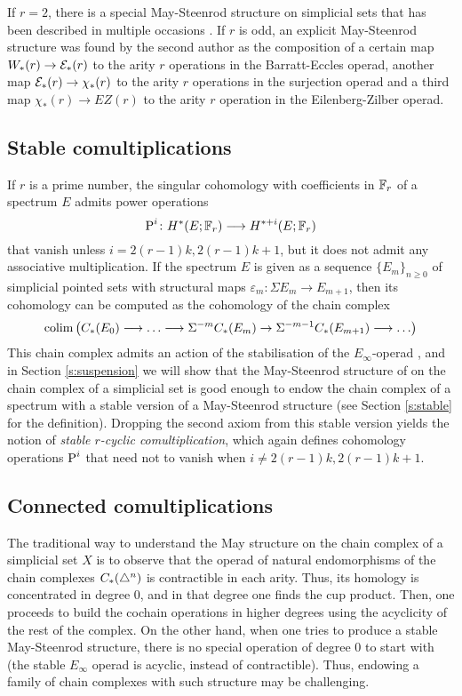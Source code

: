 If $r=2$, there is a special May-Steenrod structure on simplicial sets that has been described in multiple occasions \cite{steenrod1947products,gonzalez-diaz1999steenrod,medina2021fast_sq}. If $r$ is odd, an explicit May-Steenrod structure was found by the second author \cite{medina2021may_st} as the composition of a certain map $W_*(r)\to \mathcal{E}_*(r)$ to the arity $r$ operations in the Barratt-Eccles operad, another map $\mathcal{E}_*(r)\to \chi_*(r)$ to the arity $r$ operations in the surjection operad \cite{berger2004combinatorial} and a third map $\chi_*(r)\to EZ(r)$ to the arity $r$ operation in the Eilenberg-Zilber operad\cite{mcclure2003multivariable}.

\subsection{Stable comultiplications} If $r$ is a prime number, the singular cohomology with coefficients in $\mathbb{F}_r$ of a spectrum $E$ admits power operations
\[
	\operatorname{P}^i\colon H^*(E;\mathbb{F}_r)\longrightarrow H^{*+i}(E;\mathbb{F}_r)
\]
that vanish unless $i = 2(r-1)k, 2(r-1)k+1$, but it does not admit any associative multiplication. If the spectrum $E$ is given as a sequence $\{E_m\}_{n\geq 0}$ of simplicial pointed sets with structural maps $\varepsilon_m\colon \Sigma E_m\to E_{m+1}$, then its cohomology can be computed as the cohomology of the chain complex
\[
	\operatorname*{colim} \left(C_*(E_0)\longrightarrow \ldots \longrightarrow \Sigma^{-m}C_*(E_m)\to \Sigma^{-m-1} C_*(E_{m+1})\longrightarrow\ldots\right)
\]
This chain complex admits an action of the stabilisation of the $E_{\infty}$-operad \cite{Gill2020}, and in Section \ref{s:suspension} we will show that the May-Steenrod structure of \cite{medina2021may_st} on the chain complex of a simplicial set is good enough to endow the chain complex of a spectrum with a stable version of a May-Steenrod structure (see Section \ref{s:stable} for the definition). Dropping the second axiom from this stable version yields the notion of \emph{stable $r$-cyclic comultiplication}, which again defines cohomology operations $\operatorname{P}^i$ that need not to vanish when $i \neq 2(r-1)k, 2(r-1)k+1$. 

\subsection{Connected comultiplications} The traditional way to understand the May structure on the chain complex of a simplicial set $X$ is to observe that the operad of natural endomorphisms of the chain complexes $C_*(\triangle^n)$ is contractible in each arity. Thus, its homology is concentrated in degree $0$, and in that degree one finds the cup product. Then, one proceeds to build the cochain operations in higher degrees using the acyclicity of the rest of the complex. On the other hand, when one tries to produce a stable May-Steenrod structure, there is no special operation of degree $0$ to start with (the stable $E_{\infty}$ operad is acyclic, instead of contractible). Thus, endowing a family of chain complexes with such structure may be challenging. 

